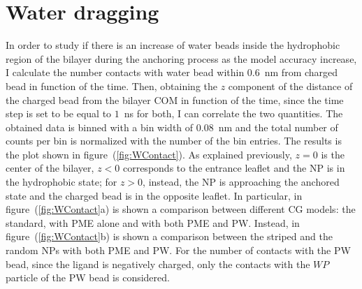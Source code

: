 \section{Water dragging}
\label{sec:WDragging}
In order to study if there is an increase of water beads inside the hydrophobic region of the bilayer during the anchoring process as the model accuracy increase, I calculate the number contacts with water bead within $0.6$~nm from charged bead in function of the time. Then, obtaining the $z$ component of the distance of the charged bead from the bilayer \ac{COM} in function of the time, since the time step is set to be equal to $1$~ns for both, I can correlate the two quantities. The obtained data is binned with a bin width of $0.08$~nm and the total number of counts per bin is normalized with the number of the bin entries. The results is the plot shown in figure~(\ref{fig:WContact}). As explained previously, $z=0$ is the center of the bilayer, $z<0$ corresponds to the entrance leaflet and the \ac{NP} is in the hydrophobic state; for $z>0$, instead, the \ac{NP} is approaching the anchored state and the charged bead is in the opposite leaflet. In particular, in figure~(\ref{fig:WContact}a) is shown a comparison between different \ac{CG} \martini models: the standard, with \ac{PME} alone and with both \ac{PME} and \ac{PW}. Instead, in figure~(\ref{fig:WContact}b) is shown a comparison between the striped and the random \acp{NP} with both \ac{PME} and \ac{PW}. For the number of contacts with the \ac{PW} bead, since the ligand is negatively charged, only the contacts with the $WP$ particle of the \ac{PW} bead is considered.
